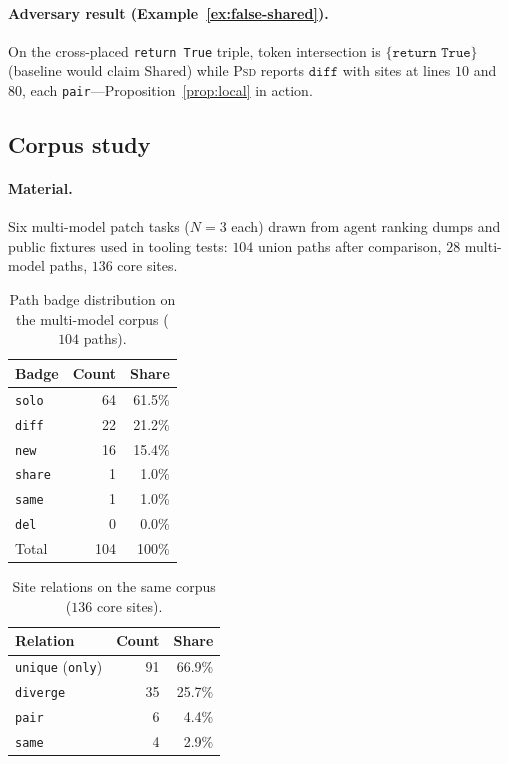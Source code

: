 \documentclass[
  11pt,
  a4paper,
  oneside,
  numbers=noenddot,
  abstract=true,
  headings=normal,
  DIV=11,
  BCOR=0mm,
]{scrartcl}
\theoremstyle{definition}
\theoremstyle{plain}
\theoremstyle{remark}
\newcommand{\PSD}{\textsc{Psd}}
\newcommand{\badge}[1]{\texttt{#1}}
\begin{document}
\paragraph{Adversary result (Example~\ref{ex:false-shared}).}
On the cross-placed \texttt{return True} triple, token intersection is
$\{\texttt{return True}\}$ (baseline would claim Shared) while \PSD{}
reports $\badge{diff}$ with sites at lines $10$ and $80$, each
\texttt{pair}---Proposition~\ref{prop:local} in action.

\subsection{Corpus study}

\paragraph{Material.}
Six multi-model patch tasks ($N=3$ each) drawn from agent ranking dumps
and public fixtures used in tooling tests: $104$ union paths after
comparison, $28$ multi-model paths, $136$ core sites.

\begin{table}[t]
\centering
\caption{Path badge distribution on the multi-model corpus ($104$ paths).}
\label{tab:corpus-badges}
\begin{tabular}{@{}lrr@{}}
\toprule
\textbf{Badge} & \textbf{Count} & \textbf{Share} \\
\midrule
\badge{solo}  & 64 & 61.5\% \\
\badge{diff}  & 22 & 21.2\% \\
\badge{new}   & 16 & 15.4\% \\
\badge{share} & 1  & 1.0\% \\
\badge{same}  & 1  & 1.0\% \\
\badge{del}   & 0  & 0.0\% \\
\midrule
Total & 104 & 100\% \\
\bottomrule
\end{tabular}
\end{table}

\begin{table}[t]
\centering
\caption{Site relations on the same corpus ($136$ core sites).}
\label{tab:corpus-sites}
\begin{tabular}{@{}lrr@{}}
\toprule
\textbf{Relation} & \textbf{Count} & \textbf{Share} \\
\midrule
\texttt{unique} (\texttt{only}) & 91 & 66.9\% \\
\texttt{diverge} & 35 & 25.7\% \\
\texttt{pair} & 6 & 4.4\% \\
\texttt{same} & 4 & 2.9\% \\
\bottomrule
\end{tabular}
\end{table}
\end{document}
